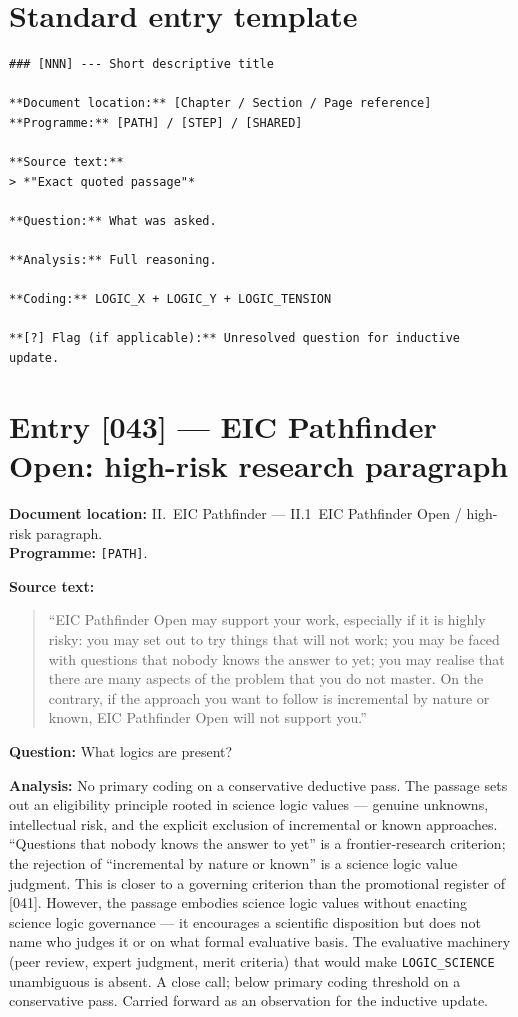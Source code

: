 \section*{Standard entry template}

\begin{verbatim}
### [NNN] --- Short descriptive title

**Document location:** [Chapter / Section / Page reference]
**Programme:** [PATH] / [STEP] / [SHARED]

**Source text:**
> *"Exact quoted passage"*

**Question:** What was asked.

**Analysis:** Full reasoning.

**Coding:** LOGIC_X + LOGIC_Y + LOGIC_TENSION

**[?] Flag (if applicable):** Unresolved question for inductive update.
\end{verbatim}

\section*{Entry [043] --- EIC Pathfinder Open: high-risk research paragraph}

\textbf{Document location:} II.~EIC Pathfinder --- II.1~EIC Pathfinder
Open / high-risk paragraph. \\
\textbf{Programme:} \texttt{[PATH]}.

\textbf{Source text:}
\begin{quote}
\enquote{EIC Pathfinder Open may support your work, especially if it is
highly risky: you may set out to try things that will not work; you
may be faced with questions that nobody knows the answer to yet; you
may realise that there are many aspects of the problem that you do not
master. On the contrary, if the approach you want to follow is
incremental by nature or known, EIC Pathfinder Open will not support
you.}
\end{quote}

\textbf{Question:} What logics are present?

\textbf{Analysis:} No primary coding on a conservative deductive pass.
The passage sets out an eligibility principle rooted in science logic
values --- genuine unknowns, intellectual risk, and the explicit
exclusion of incremental or known approaches. \enquote{Questions that
nobody knows the answer to yet} is a frontier-research criterion; the
rejection of \enquote{incremental by nature or known} is a science
logic value judgment. This is closer to a governing criterion than the
promotional register of [041]. However, the passage embodies science
logic values without enacting science logic governance --- it
encourages a scientific disposition but does not name who judges it or
on what formal evaluative basis. The evaluative machinery (peer
review, expert judgment, merit criteria) that would make
\texttt{LOGIC\_SCIENCE} unambiguous is absent. A close call; below
primary coding threshold on a conservative pass. Carried forward as an
observation for the inductive update.

